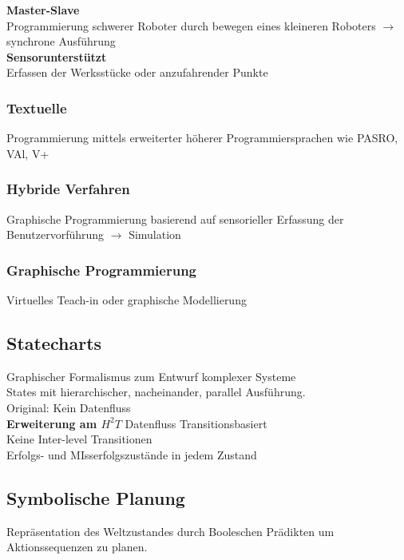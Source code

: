 \textbf{Master-Slave}\\
Programmierung schwerer Roboter durch bewegen eines kleineren Roboters \(\rightarrow\) synchrone Ausführung\\

\textbf{Sensorunterstützt}\\
Erfassen der Werksstücke oder anzufahrender Punkte\\

\subsubsection{Textuelle}
Programmierung mittels erweiterter höherer Programmiersprachen wie PASRO, VAl, V+


\subsubsection{Hybride Verfahren}
Graphische Programmierung basierend auf sensorieller Erfassung der Benutzervorführung \(\rightarrow\) Simulation

\subsubsection{Graphische Programmierung}
Virtuelles Teach-in oder graphische Modellierung


\subsection{Statecharts}
Graphischer Formalismus zum Entwurf komplexer Systeme\\
States mit hierarchischer, nacheinander, parallel Ausführung.\\
Original: Kein Datenfluss\\

\textbf{Erweiterung am \(H^2T\)}
Datenfluss Transitionsbasiert\\
Keine Inter-level Transitionen\\
Erfolgs- und MIsserfolgszustände in jedem Zustand


\subsection{Symbolische Planung}
Repräsentation des Weltzustandes durch Booleschen Prädikten um Aktionssequenzen zu planen.\\

